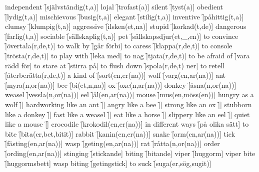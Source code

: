 \begin{questions}
    \begin{multicols}{2}
        \raggedcolumns
        \question independent \f[självständig(t,a)]
        \question lojal \f[trofast(a)]
        \question silent \f[tyst(a)]
        \question obedient \f[lydig(t,a)]
        \question mischievous \f[busig(t,a)]
        \question elegant \f[stilig(t,a)]
        \question inventive \f[påhittig(t,a)]
        \question clumsy \f[klumpig(t,a)]
        \question aggressive \f[ilsken(et,na)]
        \question stupid \f[korkad(t,de)]
        \question dangerous \f[farlig(t,a)]
        \question sociable \f[sällskaplig(t,a)]
        \question pet \f[sällskapsdjur(et,\_,en)]
        \question to convince \f[övertala(r,de,t)]
        \question to walk by \f[går förbi]
        \question to caress \f[klappa(r,de,t)]
        \question to console \f[trösta(r,de,t)]
        \question to play with \f[leka med]
        \question to nag \f[tjata(r,de,t)]
        \question to be afraid of \f[vara rädd för]
        \question to stare at \f[stirra på]
        \question to flush down \f[spola(r,de,t) ner]
        \question to retell \f[återberätta(r,de,t)]
        \question a kind of \f[sort(en,er(na))]
        \question wolf \f[varg(en,ar(na))]
        \question ant \f[myra(n,or(na))]
        \question bee \f[bi(et,n,na)]
        \question ox \f[oxe(n,ar(na))]
        \question donkey \f[åsna(n,or(na))]
        \question weasel \f[vessla(n,or(na))]
        \question eel \f[ål(en,ar(na))]
        \question mouse \f[mus(en,möss(en))]
        \question hungry as a wolf \f[]
        \question hardworking like an ant \f[]
        \question angry like a bee \f[]
        \question strong like an ox \f[]
        \question stubborn like a donkey \f[]
        \question fast like a weasel \f[]
        \question eat like a horse \f[]
        \question slippery like an eel \f[]
        \question quiet like a mouse \f[]
        \question crocodile \f[krokodil(en,er(na))]
        \question in different ways \f[på olika sätt]
        \question to bite \f[bita(er,bet,bitit)]
        \question rabbit \f[kanin(en,er(na))]
        \question snake \f[orm(en,ar(na))]
        \question tick \f[fästing(en,ar(na))]
        \question wasp \f[geting(en,ar(na))]
        \question rat \f[råtta(n,or(na))]
        \question order \f[ording(en,ar(na))]
        \question stinging \f[stickande]
        \question biting \f[bitande]
        \question viper \f[huggorm]
        \question viper bite \f[huggormsbett]
        \question wasp biting \f[getingstick]
        \question to suck \f[suga(er,sög,sugit)]

\end{multicols}
\end{questions}
